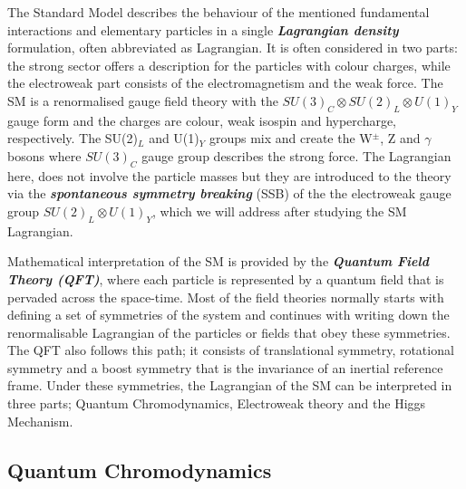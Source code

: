 The Standard Model describes the behaviour of the mentioned fundamental interactions and elementary particles in a single \textbf{\textit{Lagrangian density}} formulation, often abbreviated as Lagrangian. It is often considered in two parts: the strong sector offers a description for the particles with colour charges, while the electroweak part consists of the electromagnetism and the weak force. The SM is a renormalised gauge field theory with the $ SU(3)_C \otimes SU(2)_L \otimes U(1)_Y$ gauge form and the charges are colour, weak isospin and hypercharge, respectively. The SU(2)$_L$ and U(1)$_Y$ groups mix and create the W$^{\pm}$, Z and $\gamma$ bosons where $SU(3)_C$ gauge group describes the strong force. The Lagrangian  here, does not involve the particle masses but they are introduced to the theory via the \textbf{\emph{spontaneous symmetry breaking}} (SSB) of the the electroweak gauge group $SU(2)_L \otimes U(1)_Y$, which we will address after studying the SM Lagrangian.

Mathematical interpretation of the SM is provided by the \textbf{\emph{Quantum Field Theory (QFT)}}, where each particle is represented by a quantum field that is pervaded across the space-time. Most of the field theories normally starts with defining a set of symmetries of the system and continues with writing down the renormalisable Lagrangian of the particles or fields that obey these symmetries. The QFT also follows this path; it consists of translational symmetry, rotational symmetry and a boost symmetry that is the invariance of an inertial reference frame. Under these symmetries, the Lagrangian of the SM can be interpreted in three parts; Quantum Chromodynamics, Electroweak theory and the Higgs Mechanism.

\subsection{Quantum Chromodynamics}

